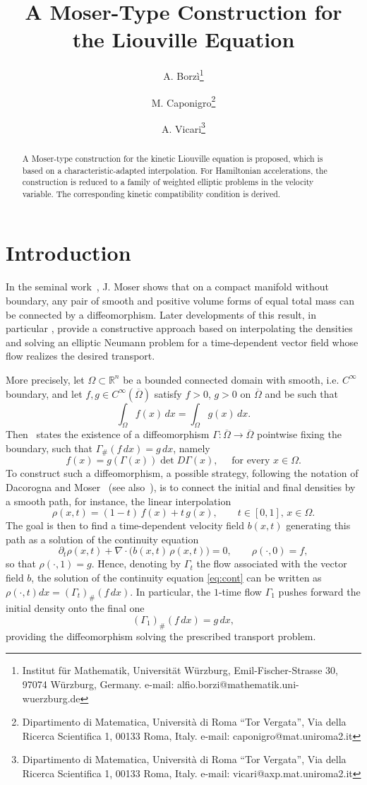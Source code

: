\documentclass[11pt]{article}
\title{\textbf{A Moser-Type Construction for the Liouville Equation}}
\author{A. Borz\`i\thanks{Institut f\"ur Mathematik, Universit\"at W\"urzburg, Emil-Fischer-Strasse 30,
97074 W\"urzburg, Germany. e-mail: alfio.borzi@mathematik.uni-wuerzburg.de} 
\and M. Caponigro\thanks{Dipartimento di Matematica,
Università di Roma ``Tor Vergata'',
Via della Ricerca Scientifica 1,
00133 Roma,
Italy. e-mail: caponigro@mat.uniroma2.it} 
\and A. Vicari\thanks{Dipartimento di Matematica,
Università di Roma ``Tor Vergata'',
Via della Ricerca Scientifica 1,
00133 Roma,
Italy. e-mail: vicari@axp.mat.uniroma2.it} }
\date{}
\begin{document}
\maketitle

\begin{abstract}
A Moser-type construction for the kinetic Liouville equation is proposed, 
which is based on a
characteristic-adapted interpolation. For Hamiltonian accelerations,
the construction is reduced to a family of weighted elliptic problems in the
velocity variable. The corresponding kinetic compatibility condition is
derived.
\end{abstract}


\section{Introduction}

In the seminal work~\cite{moser65}, J. Moser shows that on a compact manifold without 
boundary, any pair of smooth and positive volume forms of equal total mass can be 
connected by a diffeomorphism. Later developments of this result, in particular \cite{dacorognamoser}, 
provide a constructive approach based on interpolating the densities and solving an elliptic
Neumann problem for a time-dependent vector field whose flow realizes the
desired transport. 


More precisely, let $\Omega\subset \mathbb{R}^n$ be a bounded connected domain with smooth, i.e.
$C^\infty$ boundary, and let $f,g\in C^\infty(\overline{\Omega})$ satisfy
$f>0$, $g>0$ on $\overline{\Omega}$ and be such that 
$$
\int_\Omega f(x)\,dx=\int_\Omega g(x)\,dx.
$$
Then~\cite{moser65} states the 
existence of a diffeomorphism $\Gamma: \overline{\Omega} \to \overline{\Omega}$ pointwise 
fixing the boundary, such that $\Gamma_\#(f\,dx)=g\,dx$, namely
$$
f(x)=g(\Gamma(x))\det D\Gamma(x), \quad \mbox{ for every } x \in \Omega.
$$
To construct such a diffeomorphism, a possible strategy, following the notation of 
Dacorogna and Moser~\cite{dacorognamoser} (see also~\cite[Box 4.3]{santambrogio2015optimal}), is to
connect the initial and final densities by a smooth path, for instance, the linear interpolation
\begin{equation}
\rho(x,t)=(1-t) \, f(x)+t \, g(x) , \qquad t\in[0,1], \, x \in \Omega .
\label{origInterpolation}
\end{equation}
The goal is then to find a time-dependent velocity field $b(x,t)$ generating this path as a 
solution of the continuity equation
\begin{equation}\label{eq:cont}
\partial_t \rho(x,t) + \nabla \cdot \big(b(x,t) \, \rho(x,t)\big) = 0,
\qquad \rho(\cdot,0)=f, 
\end{equation}
so that $\rho(\cdot,1)=g$.  Hence, denoting by $\Gamma_t$ the flow associated with the vector field $b$,
the solution of the continuity equation \eqref{eq:cont} can be written as 
$\rho(\cdot,t)dx=(\Gamma_t)_{\#}(f\,dx)$. In particular, the $1$-time flow $\Gamma_1$ pushes 
forward the initial density onto the final one
$$
(\Gamma_1)_\# (f\,dx)=g\,dx ,
$$
providing the diffeomorphism solving the prescribed transport problem.
\end{document}
